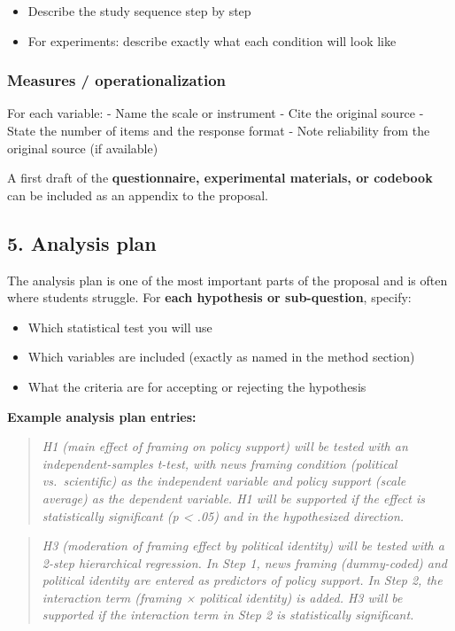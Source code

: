 \documentclass[
  11pt,
  a4paper,
]{scrbook}
\providecommand{\tightlist}{%
  \setlength{\itemsep}{0pt}\setlength{\parskip}{0pt}}\usepackage{longtable,booktabs,array}
\begin{document}
\begin{itemize}
\tightlist
\item
  Describe the study sequence step by step
\item
  For experiments: describe exactly what each condition will look like
\end{itemize}

\subsubsection{Measures /
operationalization}\label{measures-operationalization}

For each variable: - Name the scale or instrument - Cite the original
source - State the number of items and the response format - Note
reliability from the original source (if available)

A first draft of the \textbf{questionnaire, experimental materials, or
codebook} can be included as an appendix to the proposal.

\subsection{5. Analysis plan}\label{analysis-plan}

The analysis plan is one of the most important parts of the proposal and
is often where students struggle. For \textbf{each hypothesis or
sub-question}, specify:

\begin{itemize}
\tightlist
\item
  Which statistical test you will use
\item
  Which variables are included (exactly as named in the method section)
\item
  What the criteria are for accepting or rejecting the hypothesis
\end{itemize}

\textbf{Example analysis plan entries:}

\begin{quote}
\emph{H1 (main effect of framing on policy support) will be tested with
an independent-samples t-test, with news framing condition (political
vs.~scientific) as the independent variable and policy support (scale
average) as the dependent variable. H1 will be supported if the effect
is statistically significant (p \textless{} .05) and in the hypothesized
direction.}
\end{quote}

\begin{quote}
\emph{H3 (moderation of framing effect by political identity) will be
tested with a 2-step hierarchical regression. In Step 1, news framing
(dummy-coded) and political identity are entered as predictors of policy
support. In Step 2, the interaction term (framing × political identity)
is added. H3 will be supported if the interaction term in Step 2 is
statistically significant.}
\end{quote}
\end{document}
